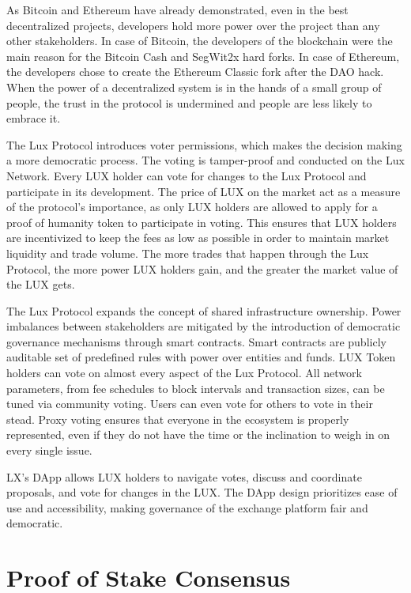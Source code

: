 \documentclass[11pt]{article}
\begin{document}
As Bitcoin and Ethereum have already demonstrated, even in the best decentralized projects, developers hold more power over the project than any other stakeholders. In case of Bitcoin, the developers of the blockchain were the main reason for the Bitcoin Cash and SegWit2x hard forks. In case of Ethereum, the developers chose to create the Ethereum Classic fork after the DAO hack. When the power of a decentralized system is in the hands of a small group of people, the trust in the protocol is undermined and people are less likely to embrace it.


The Lux Protocol introduces voter permissions, which makes the decision making a more democratic process. The voting is tamper-proof and conducted on the Lux Network. Every LUX holder can vote for changes to the Lux Protocol and participate in its development. The price of LUX on the market act as a measure of the protocol's importance, as only LUX holders are allowed to apply for a proof of humanity token to participate in voting. This ensures that LUX holders are incentivized to keep the fees as low as possible in order to maintain market liquidity and trade volume. The more trades that happen through the Lux Protocol, the more power LUX holders gain, and the greater the market value of the LUX gets.


The Lux Protocol expands the concept of shared infrastructure ownership. Power imbalances between stakeholders are mitigated by the introduction of democratic governance mechanisms through smart contracts. Smart contracts are publicly auditable set of predefined rules with power over entities and funds. LUX Token holders can vote on almost every aspect of the Lux Protocol. All network parameters, from fee schedules to block intervals and transaction sizes, can be tuned via community voting. Users can even vote for others to vote in their stead. Proxy voting ensures that everyone in the ecosystem is properly represented, even if they do not have the time or the inclination to weigh in on every single issue.


LX's DApp allows LUX holders to navigate votes, discuss and coordinate proposals, and vote for changes in the LUX. The DApp design prioritizes ease of use and accessibility, making governance of the exchange platform fair and democratic.


\section{Proof of Stake Consensus}
\end{document}
